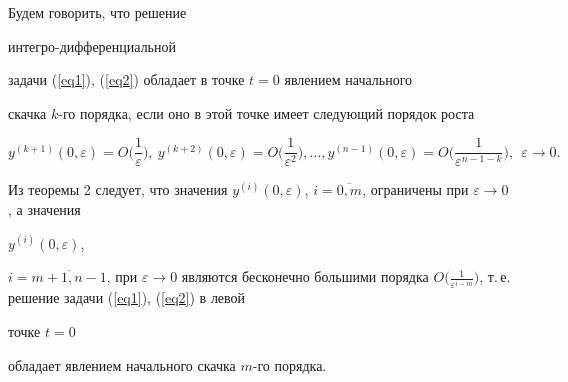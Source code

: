 \begin{defnnonum}


Будем говорить, что решение 


интегро-дифференциальной 


задачи (\ref{eq1}), (\ref{eq2}) обладает в точке $t = 0$ явлением начального 


скачка $k$-го порядка, если оно в этой точке имеет следующий порядок роста


$$


y^{(k + 1)}(0,\varepsilon ) = O\bigg( {{\frac{{1}}{{\varepsilon}} }} 


\bigg),\ y^{(k + 2)}(0,\varepsilon ) = O\bigg( {{\frac{{1}}{{\varepsilon 


^{2}}}}} \bigg),\dotsc,y^{(n - 1)}(0,\varepsilon ) = O\bigg( 


{{\frac{{1}}{{\varepsilon ^{n - 1 - k}}}}} \bigg),\ \ \varepsilon \to 0.


$$


\end{defnnonum}





Из теоремы 2 следует, что значения $y^{(i)}(0,\varepsilon)$, $i=\overline 


{0,m}$, ограничены при $\varepsilon \to 0$, а значения 


$y^{(i)}(0,\varepsilon)$,


$i = \overline {m + 1,n - 1}$, при $\varepsilon \to 


0$ являются бесконечно большими порядка $O\big( {{\frac{{1}}{{\varepsilon 


^{i - m}}}}} \big)$, т.\,е. решение задачи (\ref{eq1}), (\ref{eq2}) в левой 


точке $t = 0$ 


обладает явлением начального скачка $m$-го порядка.





